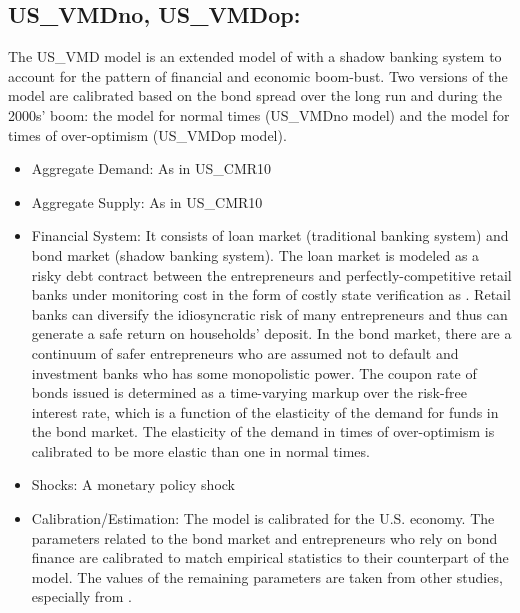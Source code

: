 \documentclass[11pt,a4paper]{article}
\begin{document}
	
	
	
	\subsection{ US\_VMDno, US\_VMDop: \cite{Veronaetal2013}}
	\label{USVMDno}
	\label{USVMDop}
	The US\_VMD model is an extended model of \cite{Christianoetal2010} with a shadow banking system to account for the pattern of financial and economic boom-bust. Two versions of the model are calibrated based on the bond spread over the long run and during the 2000s' boom: the model for normal times (US\_VMDno model) and the model for times of over-optimism (US\_VMDop model).
	\begin{itemize}
		\item Aggregate Demand: As in US\_CMR10
		\item Aggregate Supply: As in US\_CMR10
		\item Financial System: It consists of loan market (traditional banking system) and bond market (shadow banking system). The loan market is modeled as a risky debt contract between the entrepreneurs and perfectly-competitive retail banks under monitoring cost in the form of costly state verification as \cite{BernankeGertlerGilchrist1999}. Retail banks can diversify the idiosyncratic risk of many entrepreneurs and thus can generate a safe return on households' deposit. In the bond market, there are a continuum of safer entrepreneurs who are assumed not to default and investment banks who has some monopolistic power. The coupon rate of bonds issued is determined as a time-varying markup over the risk-free interest rate, which is a function of the elasticity of the demand for funds in the bond market. The elasticity of the demand in times of over-optimism is calibrated to be more elastic than one in normal times.
		\item Shocks: A monetary policy shock
		\item Calibration/Estimation: The model is calibrated for the U.S. economy. The parameters related to the bond market and entrepreneurs who rely on bond finance are calibrated to match empirical statistics to their counterpart of the model. The values of the remaining parameters are taken from other studies, especially from \cite{Christianoetal2010}.
	\end{itemize}
	
	
	
\end{document}
